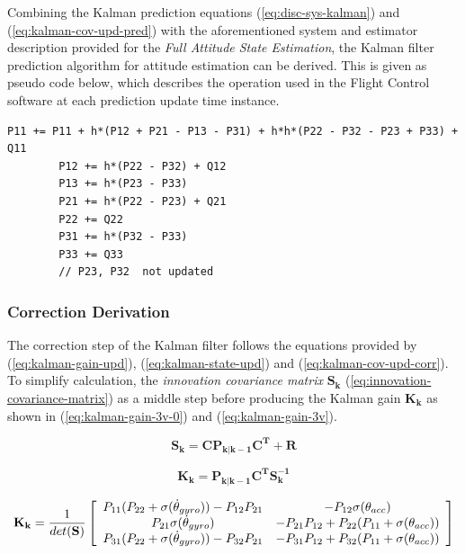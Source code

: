 \documentclass[a4paper]{report}
\begin{document}
Combining the Kalman prediction equations (\ref{eq:disc-sys-kalman}) and (\ref{eq:kalman-cov-upd-pred}) with the aforementioned system and estimator description provided for the \emph{Full Attitude State Estimation}, the Kalman filter prediction algorithm for attitude estimation can be derived. This is given as pseudo code below, which describes the operation used in the Flight Control software at each prediction update time instance. 

		\begin{lstlisting}[frame=single, label={eq:error-covariance-prediction-3v},caption={Error covariance prediction pseudo code}]
		P11 += P11 + h*(P12 + P21 - P13 - P31) + h*h*(P22 - P32 - P23 + P33) + Q11
		P12 += h*(P22 - P32) + Q12
		P13 += h*(P23 - P33)
		P21 += h*(P22 - P23) + Q21
		P22 += Q22
		P31 += h*(P32 - P33)
		P33 += Q33
		// P23, P32  not updated
		\end{lstlisting}

		\subsubsection{Correction Derivation}

The correction step of the Kalman filter follows the equations provided by (\ref{eq:kalman-gain-upd}), (\ref{eq:kalman-state-upd}) and (\ref{eq:kalman-cov-upd-corr}). To simplify calculation, the \emph{innovation covariance matrix} $\mathbf{S_k}$ (\ref{eq:innovation-covariance-matrix}) as a middle step before producing the Kalman gain $\mathbf{K_k}$ as shown in (\ref{eq:kalman-gain-3v-0}) and (\ref{eq:kalman-gain-3v}).

\begin{equation}
		\label{eq:innovation-covariance-matrix-3v}
		\mathbf{S_{k}} = \mathbf{C P_{k|k-1} C^T} + \mathbf{R}
\end{equation}

\begin{equation}
		\label{eq:kalman-gain-3v-0}
		\mathbf{K_{k}} = \mathbf{P_{k|k-1} C^T S_k^{-1}}
\end{equation}

\begin{equation}
		\label{eq:kalman-gain-3v}
		\mathbf{K_k}  =
		\frac{1}{det(\mathbf{S})}
		  \left[ \begin{array}{c c}
		      P_{11}(P_{22} + \sigma(\dot{\theta}_{gyro})) - P_{12}P_{21} & -P_{12}\sigma(\theta_{acc}) \\
          P_{21}\sigma(\dot{\theta}_{gyro})                           & -P_{21}P_{12} + P_{22}(P_{11} + \sigma(\theta_{acc}))\\
          P_{31}(P_{22}+\sigma(\dot{\theta}_{gyro})) - P_{32}P_{21}   & -P_{31}P_{12}+P_{32}(P_{11}+\sigma(\theta_{acc}))
		    \end{array} \right]
\end{equation}
\end{document}
